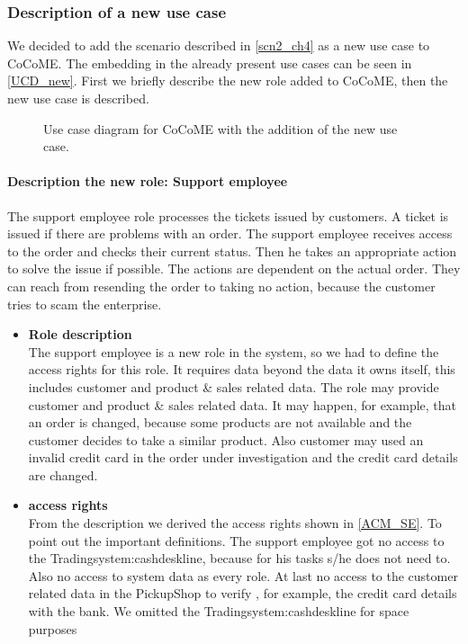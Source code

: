 \subsubsection{Description of a new use case}
We decided to add the scenario described in \autoref{scn2_ch4} as a new use case to CoCoME. The embedding in the already present use cases can be seen in \autoref{UCD_new}.  First we briefly describe the new role added to CoCoME, then the new use case is described.
\begin{figure}
\caption{Use case diagram for CoCoME with the addition of the new use case.}
\label{UCD_new}
\end{figure}
\paragraph{Description the new role: Support employee}
The support employee role processes the tickets issued by customers. A ticket is issued if there are problems with an order. The support employee receives access to the order and checks their current status. Then he takes an appropriate action to solve the issue if possible. The actions are dependent on the actual order. They can reach from resending the order to taking no action, because the customer tries to scam the enterprise.
\begin{itemize}
\item \textbf{Role description}\\
The support employee is a new role in the system, so we had to define the access rights for this role. It requires data beyond the data it owns itself, this includes customer and product \& sales related data. The role may provide customer and product \& sales related data. It may happen, for example, that an order is changed, because some products are not available and the customer decides to take a similar product. Also customer may used an invalid credit card in the order under investigation and the credit card details are changed.
\item \textbf{access rights}\\
From the description we derived the access rights shown in \autoref{ACM_SE}. To point out the important definitions. The support employee got no access to the Tradingsystem:cashdeskline, because for his tasks s/he does not need to. Also no access to system data as every role. At last no access to the customer related data in the PickupShop to verify , for example, the credit card details with the bank. We omitted the Tradingsystem:cashdeskline for space purposes 
\end{itemize}
